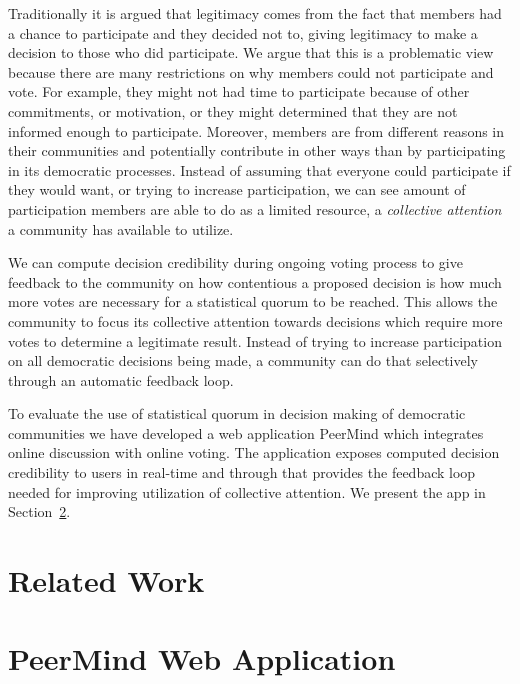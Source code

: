 \documentclass[chi_draft]{sigchi}
\begin{document}
Traditionally it is argued that legitimacy comes from the fact that members had a chance to participate
and they decided not to, giving legitimacy to make a decision to those who did participate.
We argue that this is a problematic view because there are many restrictions on why members could not
participate and vote.
For example, they might not had time to participate because of other commitments, or motivation, or they might determined
that they are not informed enough to participate.
Moreover, members are from different reasons in their communities and potentially contribute in other ways
than by participating in its democratic processes.
Instead of assuming that everyone could participate if they would want, or trying to increase participation,
we can see amount of participation members are able to do as a limited resource, a \emph{collective attention}
a community has available to utilize.

We can compute decision credibility during ongoing voting process to give feedback to the community
on how contentious a proposed decision is how much more votes are necessary for a statistical quorum
to be reached.
This allows the community to focus its collective attention towards decisions which require more votes
to determine a legitimate result.
Instead of trying to increase participation on all democratic decisions being made, a community can
do that selectively through an automatic feedback loop.

To evaluate the use of statistical quorum in decision making of democratic communities we have developed
a web application PeerMind which integrates online discussion with online voting.
The application exposes computed decision credibility to users in real-time and through that provides
the feedback loop needed for improving utilization of collective attention.
We present the app in Section~\ref{sec:peermind}.


\section{Related Work}


\section{PeerMind Web Application}
\label{sec:peermind}
\end{document}

